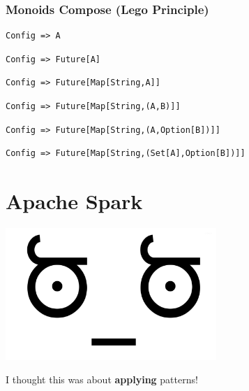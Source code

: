 \documentclass{beamer}
\begin{document}
\begin{frame}[fragile]
  \frametitle{Monoids Compose (Lego Principle)}
\begin{verbatim}
Config => A
\end{verbatim}
\begin{verbatim}
Config => Future[A]
\end{verbatim}
\begin{verbatim}
Config => Future[Map[String,A]]
\end{verbatim}
\begin{verbatim}
Config => Future[Map[String,(A,B)]]
\end{verbatim}
\begin{verbatim}
Config => Future[Map[String,(A,Option[B])]]
\end{verbatim}
\begin{verbatim}
Config => Future[Map[String,(Set[A],Option[B])]]
\end{verbatim}
\end{frame}

\section{Apache Spark}

\begin{frame}
  \begin{center}
    \includegraphics[width=0.6\textwidth]{../images/disapproval.jpg}
  \end{center}
  \begin{center}
    {\large I thought this was about \textbf{applying} patterns!}
  \end{center}
\end{frame}
\end{document}
